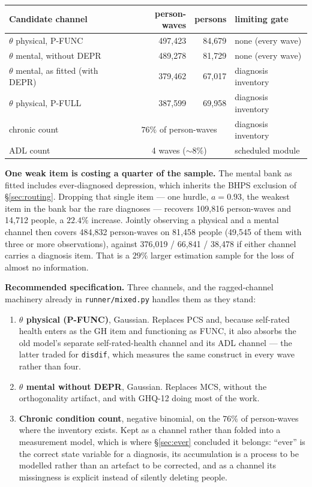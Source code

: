 \documentclass[11pt]{article}
\newcommand{\code}[1]{\texttt{\small #1}}
\begin{document}
\begin{center}\small
\begin{tabular}{lrrl}
\toprule
Candidate channel & person-waves & persons & limiting gate \\
\midrule
$\theta$ physical, P-FUNC & 497{,}423 & 84{,}679 & none (every wave) \\
$\theta$ mental, without DEPR & 489{,}278 & 81{,}729 & none (every wave) \\
$\theta$ mental, as fitted (with DEPR) & 379{,}462 & 67{,}017 & diagnosis inventory \\
$\theta$ physical, P-FULL & 387{,}599 & 69{,}958 & diagnosis inventory \\
chronic count & \multicolumn{2}{c}{$76\%$ of person-waves} & diagnosis inventory \\
ADL count & \multicolumn{2}{c}{4 waves ($\sim 8\%$)} & scheduled module \\
\bottomrule
\end{tabular}
\end{center}

\textbf{One weak item is costing a quarter of the sample.} The mental bank as
fitted includes ever-diagnosed depression, which inherits the BHPS exclusion
of \S\ref{sec:routing}. Dropping that single item --- one hurdle, $a =
0.93$, the weakest item in the bank bar the rare diagnoses --- recovers
109{,}816 person-waves and 14{,}712 people, a $22.4\%$ increase. Jointly
observing a physical and a mental channel then covers 484{,}832 person-waves
on 81{,}458 people (49{,}545 of them with three or more observations),
against 376{,}019 / 66{,}841 / 38{,}478 if either channel carries a
diagnosis item. That is a $29\%$ larger estimation sample for the loss of
almost no information.

\textbf{Recommended specification.} Three channels, and the ragged-channel
machinery already in \code{runner/mixed.py} handles them as they stand:

\begin{enumerate}\itemsep2pt
\item \textbf{$\theta$ physical (P-FUNC)}, Gaussian. Replaces PCS and,
because self-rated health enters as the GH item and functioning as FUNC, it
also absorbs the old model's separate self-rated-health channel and its ADL
channel --- the latter traded for \code{disdif}, which measures the same
construct in every wave rather than four.
\item \textbf{$\theta$ mental without DEPR}, Gaussian. Replaces MCS, without
the orthogonality artifact, and with GHQ-12 doing most of the work.
\item \textbf{Chronic condition count}, negative binomial, on the $76\%$ of
person-waves where the inventory exists. Kept as a channel rather than folded
into a measurement model, which is where \S\ref{sec:ever} concluded it
belongs: ``ever'' is the correct state variable for a diagnosis, its
accumulation is a process to be modelled rather than an artefact to be
corrected, and as a channel its missingness is explicit instead of silently
deleting people.
\end{enumerate}
\end{document}

